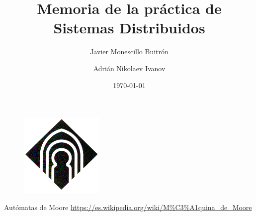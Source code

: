 \documentclass[12pt,a4paper]{article}
\author{Javier Monescillo Buitrón  \and Adrián Nikolaev Ivanov}
\title{Memoria de la práctica de Sistemas Distribuidos}
\date{\today}
\begin{document}
	
	\maketitle
	
	\begin{figure}[h]
		\centering
		\includegraphics[width=0.25
		\linewidth]{img/image004}
		\caption{}
		\label{fig:image004}
	\end{figure}

	\newpage
	\tableofcontents
	\newpage
	
	\begin{thebibliography}{99}
		 Autómatas de Moore \url{https://es.wikipedia.org/wiki/M%C3%A1quina_de_Moore}
	
	\end{thebibliography}
	
	
	
	
	
\end{document}
